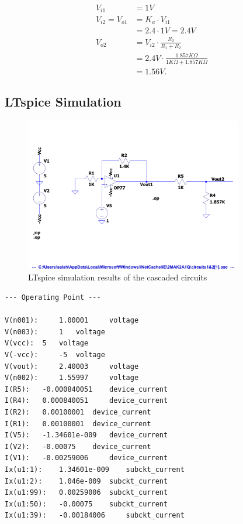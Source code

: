 \documentclass{zc-ust-hw}
\begin{document}
\begin{align}
  V_{i 1} &= 1V \\
  V_{i2} = V_{o1} &= K_a \cdot V_{i1} \\
         &= 2.4 \cdot 1V = 2.4V \\
  V_{o2} &= V_{i 2} \cdot \frac{R_2}{R_1 + R_2} \\
         &= 2.4V \cdot \frac{1.857K\Omega}{1K\Omega + 1.857K\Omega} \\
         &= 1.56V
.\end{align}

\subsection{LTspice Simulation}

\begin{figure}[H]
  \begin{center}
    \includegraphics[width=0.85\textwidth]{figures/P2.pdf}
  \end{center}
  \caption{LTspice simulation results of the cascaded circuits}\label{fig:ltspice-circuit-2}
\end{figure}

\begin{lstlisting}[caption=LTspice simulation results of the cascaded circuits, label=lst:2]
       --- Operating Point ---

V(n001):	 1.00001	 voltage
V(n003):	 1	 voltage
V(vcc):	 5	 voltage
V(-vcc):	 -5	 voltage
V(vout):	 2.40003	 voltage
V(n002):	 1.55997	 voltage
I(R5):	 -0.000840051	 device_current
I(R4):	 0.000840051	 device_current
I(R2):	 0.00100001	 device_current
I(R1):	 0.00100001	 device_current
I(V5):	 -1.34601e-009	 device_current
I(V2):	 -0.00075	 device_current
I(V1):	 -0.00259006	 device_current
Ix(u1:1):	 1.34601e-009	 subckt_current
Ix(u1:2):	 1.046e-009	 subckt_current
Ix(u1:99):	 0.00259006	 subckt_current
Ix(u1:50):	 -0.00075	 subckt_current
Ix(u1:39):	 -0.00184006	 subckt_current
\end{lstlisting}
\end{document}
